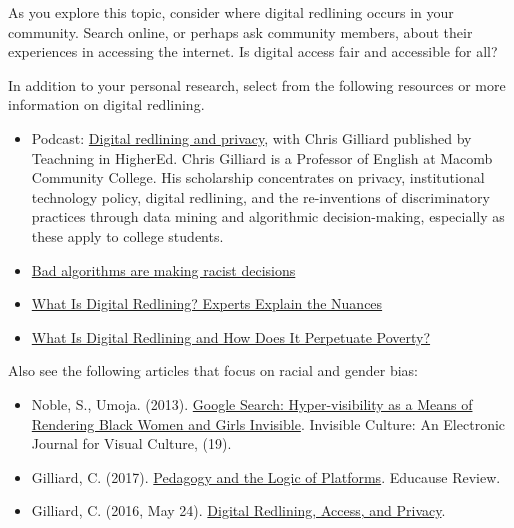 \documentclass[
]{book}
\providecommand{\tightlist}{%
  \setlength{\itemsep}{0pt}\setlength{\parskip}{0pt}}
\theoremstyle{definition}
\theoremstyle{definition}
\theoremstyle{definition}
\theoremstyle{definition}
\theoremstyle{remark}
\begin{document}
\begin{reflect}
As you explore this topic, consider where digital redlining occurs in your community. Search online, or perhaps ask community members, about their experiences in accessing the internet. Is digital access fair and accessible for all?

In addition to your personal research, select from the following resources or more information on digital redlining.

\begin{itemize}
\tightlist
\item
  Podcast: \href{https://teachinginhighered.com/podcast/digital-redlining-privacy/}{Digital redlining and privacy}, with Chris Gilliard published by Teachning in HigherEd. Chris Gilliard is a Professor of English at Macomb Community College. His scholarship concentrates on privacy, institutional technology policy, digital redlining, and the re-inventions of discriminatory practices through data mining and algorithmic decision-making, especially as these apply to college students.\\
\item
  \href{https://www.cbc.ca/radio/spark/412-1.4887497/bad-algorithms-are-making-racist-decisions-1.4887504}{Bad algorithms are making racist decisions}\\
\item
  \href{https://www.govtech.com/network/what-is-digital-redlining-experts-explain-the-nuances}{What Is Digital Redlining? Experts Explain the Nuances}\\
\item
  \href{https://communitytechnetwork.org/blog/digital-redlining-and-how-it-perputates-poverty/}{What Is Digital Redlining and How Does It Perpetuate Poverty?}
\end{itemize}

Also see the following articles that focus on racial and gender bias:

\begin{itemize}
\tightlist
\item
  Noble, S., Umoja. (2013). \href{http://ivc.lib.rochester.edu/google-search-hyper-visibility-as-a-means-of-rendering-black-women-and-girls-invisible/}{Google Search: Hyper-visibility as a Means of Rendering Black Women and Girls Invisible}. Invisible Culture: An Electronic Journal for Visual Culture, (19).
\item
  Gilliard, C. (2017). \href{https://er.educause.edu/articles/2017/7/pedagogy-and-the-logic-of-platforms}{Pedagogy and the Logic of Platforms}. Educause Review.
\item
  Gilliard, C. (2016, May 24). \href{https://www.commonsense.org/education/articles/digital-redlining-access-and-privacy}{Digital Redlining, Access, and Privacy}.
\end{itemize}
\end{reflect}
\end{document}
